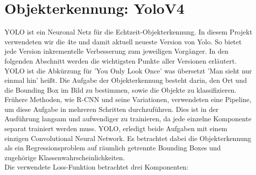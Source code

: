\documentclass[conference]{IEEEtran}
\begin{document}
	\section{Objekterkennung: YoloV4}
	YOLO ist ein Neuronal Netz für die Echtzeit-Objekterkennung. In diesem Projekt verwendeten wir die 4te und damit aktuell neueste Version von Yolo\cite{b2}. So bietet jede Version inkrementelle Verbesserung zum jeweiligen Vorgänger. In den folgenden Abschnitt werden die wichtigsten Punkte aller Versionen erläutert.\\
	YOLO ist die Abkürzung für 'You Only Look Once' was übersetzt 'Man sieht nur einmal hin' heißt. Die Aufgabe der Objekterkennung besteht darin, den Ort und die Bounding Box im Bild zu bestimmen, sowie die Objekte zu klassifizieren. Frühere Methoden, wie R-CNN und seine Variationen, verwendeten eine Pipeline, um diese Aufgabe in mehreren Schritten durchzuführen. Dies ist in der Ausführung langsam und aufwendiger zu trainieren, da jede einzelne Komponente separat trainiert werden muss. YOLO, erledigt beide Aufgaben mit einem einzigen Convolutional Neural Network. Es betrachtet dabei die Objekterkennung als ein Regressionsproblem auf räumlich getrennte Bounding Boxes und zugehörige Klassenwahrscheinlichkeiten.\\
	Die verwendete Loss-Funktion betrachtet drei Komponenten:
\end{document}
